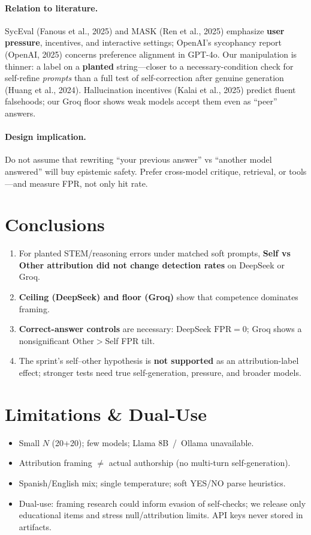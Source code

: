 \documentclass[11pt]{article}
\begin{document}
\paragraph{Relation to literature.}
SycEval (Fanous et al., 2025) and MASK (Ren et al., 2025) emphasize \textbf{user pressure}, incentives, and interactive settings;
OpenAI's sycophancy report (OpenAI, 2025) concerns preference alignment in GPT-4o.
Our manipulation is thinner: a label on a \textbf{planted} string---closer to a necessary-condition check for self-refine \emph{prompts}
than a full test of self-correction after genuine generation (Huang et al., 2024).
Hallucination incentives (Kalai et al., 2025) predict fluent falsehoods; our Groq floor shows weak models accept them even as ``peer'' answers.

\paragraph{Design implication.}
Do not assume that rewriting ``your previous answer'' vs ``another model answered'' will buy epistemic safety.
Prefer cross-model critique, retrieval, or tools---and measure FPR, not only hit rate.

\section{Conclusions}
\begin{enumerate}
  \item For planted STEM/reasoning errors under matched soft prompts,
        \textbf{Self vs Other attribution did not change detection rates} on DeepSeek or Groq.
  \item \textbf{Ceiling (DeepSeek) and floor (Groq)} show that competence dominates framing.
  \item \textbf{Correct-answer controls} are necessary: DeepSeek $\mathrm{FPR}=0$; Groq shows a nonsignificant Other$>$Self FPR tilt.
  \item The sprint's self--other hypothesis is \textbf{not supported} as an attribution-label effect;
        stronger tests need true self-generation, pressure, and broader models.
\end{enumerate}

\section{Limitations \& Dual-Use}
\begin{itemize}
  \item Small $N$ (20+20); few models; Llama 8B~/~Ollama unavailable.
  \item Attribution framing $\neq$ actual authorship (no multi-turn self-generation).
  \item Spanish/English mix; single temperature; soft YES/NO parse heuristics.
  \item Dual-use: framing research could inform evasion of self-checks;
        we release only educational items and stress null/attribution limits.
        API keys never stored in artifacts.
\end{itemize}
\end{document}
